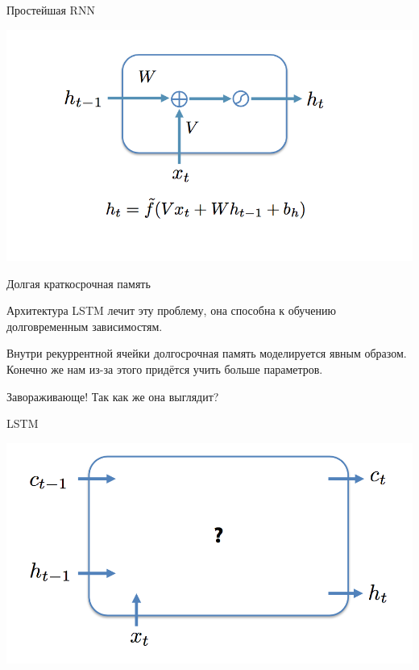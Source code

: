\documentclass[notes,12pt, aspectratio=169]{beamer}
\newenvironment{wideitemize}{\itemize\addtolength{\itemsep}{10pt}}{\enditemize}
\begin{document}
\begin{frame}{Простейшая RNN}
\begin{center}
	\includegraphics[width=.9\linewidth]{rnn14.png}
\end{center}
\end{frame}

\begin{frame}{Долгая краткосрочная память}
\begin{wideitemize}
	\item  Архитектура LSTM лечит эту проблему, она способна к обучению долговременным зависимостям.
	
	\item Внутри рекуррентной ячейки долгосрочная память моделируется явным образом. Конечно же нам из-за этого придётся учить больше параметров.
	
	\item Завораживающе! Так как же она выглядит?
\end{wideitemize}
\end{frame}


\begin{frame}{LSTM}
\begin{center}
	\includegraphics[width=.8\linewidth]{lstm1.png}
\end{center}
\end{frame}
\end{document}
